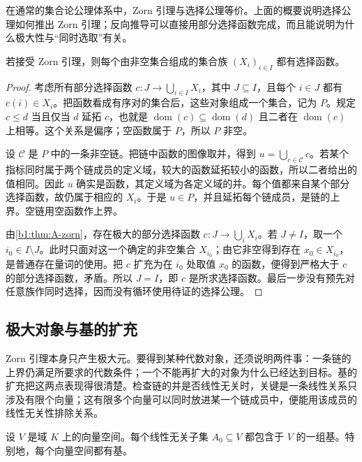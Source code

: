 \ProseParagraphBreak
在通常的集合论公理体系中，Zorn 引理与选择公理等价。上面的概要说明选择公理如何推出 Zorn 引理；反向推导可以直接用部分选择函数完成，而且能说明为什么极大性与“同时选取”有关。

\begin{proposition}\label{b1:prop:A-zorn-implies-choice}
	若接受 Zorn 引理，则每个由非空集合组成的集合族 \((X_i)_{i\in I}\) 都有选择函数。
\end{proposition}

\begin{proof}
	考虑所有部分选择函数 \(c:J\rightarrow\bigcup_{i\in I}X_i\)，其中 \(J\subseteq I\)，且每个 \(i\in J\) 都有 \(c(i)\in X_i\)。把函数看成有序对的集合后，这些对象组成一个集合，记为 \(P\)。规定 \(c\leq d\) 当且仅当 \(d\) 延拓 \(c\)，也就是 \(\operatorname{dom}(c)\subseteq\operatorname{dom}(d)\) 且二者在 \(\operatorname{dom}(c)\) 上相等。这个关系是偏序；空函数属于 \(P\)，所以 \(P\) 非空。

	设 \(\mathcal C\) 是 \(P\) 中的一条非空链。把链中函数的图像取并，得到 \(u=\bigcup_{c\in\mathcal C}c\)。若某个指标同时属于两个链成员的定义域，较大的函数延拓较小的函数，所以二者给出的值相同。因此 \(u\) 确实是函数，其定义域为各定义域的并。每个值都来自某个部分选择函数，故仍属于相应的 \(X_i\)。于是 \(u\in P\)，并且延拓每个链成员，是链的上界。空链用空函数作上界。

	由\cref{b1:thm:A-zorn}，存在极大的部分选择函数 \(c:J\rightarrow\bigcup_iX_i\)。若 \(J\ne I\)，取一个 \(i_0\in I\setminus J\)。此时只面对这一个确定的非空集合 \(X_{i_0}\)；由它非空得到存在 \(x_0\in X_{i_0}\)，是普通存在量词的使用。把 \(c\) 扩充为在 \(i_0\) 处取值 \(x_0\) 的函数，便得到严格大于 \(c\) 的部分选择函数，矛盾。所以 \(J=I\)，即 \(c\) 是所求选择函数。最后一步没有预先对任意族作同时选择，因而没有循环使用待证的选择公理。
\end{proof}

\subsection{极大对象与基的扩充}
\label{b1:subsec:A01:02}

Zorn 引理本身只产生极大元。要得到某种代数对象，还须说明两件事：一条链的上界仍满足所要求的代数条件；一个不能再扩大的对象为什么已经达到目标。基的扩充把这两点表现得很清楚。检查链的并是否线性无关时，关键是一条线性关系只涉及有限个向量；这有限多个向量可以同时放进某一个链成员中，便能用该成员的线性无关性排除关系。

\begin{proposition}\label{b1:prop:A-basis-extension}
	设 \(V\) 是域 \(K\) 上的向量空间。每个线性无关子集 \(A_0\subseteq V\) 都包含于 \(V\) 的一组基。特别地，每个向量空间都有基。
\end{proposition}

